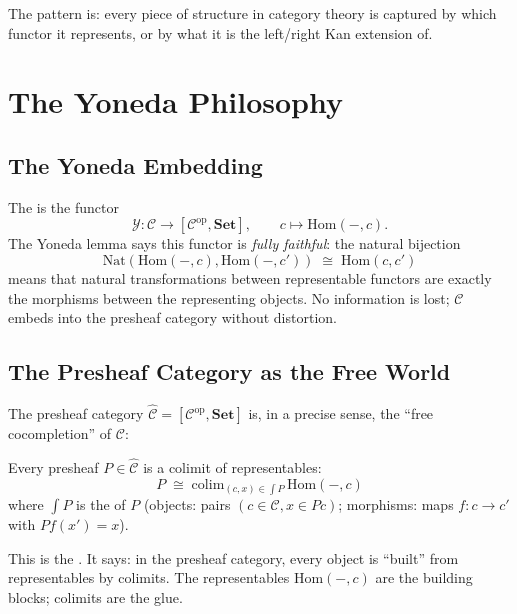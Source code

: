 The pattern is: every piece of structure in category theory is captured
by which functor it represents, or by what it is the left/right Kan
extension of.


\section{The Yoneda Philosophy}
\label{sec:yoneda-philosophy}

\subsection{The Yoneda Embedding}

The  is the functor
\[
  \mathcal{Y} : \mathcal{C} \to [\mathcal{C}^{\mathrm{op}}, \mathbf{Set}],
  \qquad c \mapsto \mathrm{Hom}(-, c).
\]
The Yoneda lemma says this functor is \emph{fully faithful}: the natural
bijection
\[
  \mathrm{Nat}(\mathrm{Hom}(-, c), \mathrm{Hom}(-, c')) \;\cong\;
  \mathrm{Hom}(c, c')
\]
means that natural transformations between representable functors are
exactly the morphisms between the representing objects. No information
is lost; $\mathcal{C}$ embeds into the presheaf category without
distortion.

\subsection{The Presheaf Category as the Free World}

The presheaf category $\hat{\mathcal{C}} = [\mathcal{C}^{\mathrm{op}},
\mathbf{Set}]$ is, in a precise sense, the ``free cocompletion'' of
$\mathcal{C}$:

\begin{theorem}
Every presheaf $P \in \hat{\mathcal{C}}$ is a colimit of representables:
\[
  P \;\cong\; \mathrm{colim}_{(c, x) \in \int P}\, \mathrm{Hom}(-, c)
\]
where $\int P$ is the  of $P$ (objects: pairs
$(c \in \mathcal{C}, x \in Pc)$; morphisms: maps $f: c \to c'$ with
$Pf(x') = x$).
\end{theorem}

This is the . It says: in the presheaf category,
every object is ``built'' from representables by colimits. The
representables $\mathrm{Hom}(-, c)$ are the building blocks; colimits are
the glue.

